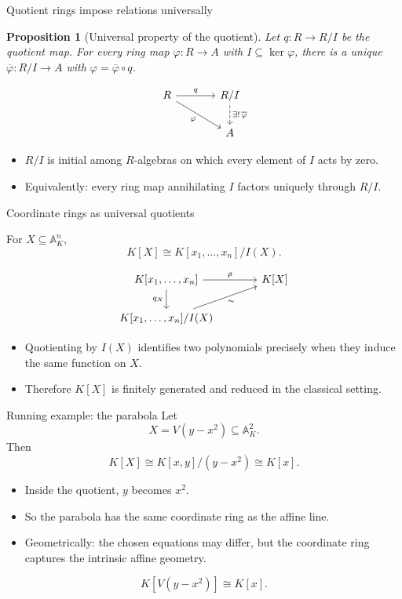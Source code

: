 \documentclass[10pt, aspectratio=169]{beamer}
\newcommand{\A}{\mathbb{A}}
\newtheorem{proposition}[theorem]{Proposition}
\begin{document}
\begin{frame}[fragile]{Quotient rings impose relations universally}
    \begin{proposition}[Universal property of the quotient]
        Let $q : R \to R/I$ be the quotient map. For every ring map
        $\varphi : R \to A$ with $I \subseteq \ker\varphi$, there is a unique
        $\overline{\varphi} : R/I \to A$ with $\varphi = \overline{\varphi} \circ q$.
    \end{proposition}
    \[
    \begin{tikzcd}[column sep=large]
        R \arrow[r, "q"] \arrow[dr, "\varphi"'] & R/I \arrow[d, dashed, "\exists!\,\overline\varphi"] \\
        & A
    \end{tikzcd}
    \]
    \begin{itemize}
        \item $R/I$ is initial among $R$-algebras on which every element of $I$ acts by zero.
        \item Equivalently: every ring map annihilating $I$ factors uniquely through $R/I$.
    \end{itemize}
\end{frame}

\begin{frame}[fragile]{Coordinate rings as universal quotients}
    \begin{corollary}
        For $X \subseteq \A_K^n$,
        \[
        \boxed{K[X] \cong K[x_1,\dots,x_n]/I(X).}
        \]
    \end{corollary}
    \[
    \begin{tikzcd}[column sep=large]
        K[x_1,\dots,x_n] \arrow[r, "\rho"] \arrow[d, "q_X"'] & K[X] \\
        K[x_1,\dots,x_n]/I(X) \arrow[ur, "\sim"'] &
    \end{tikzcd}
    \]
    \begin{itemize}
        \item Quotienting by $I(X)$ identifies two polynomials precisely when they induce the same function on $X$.
        \item Therefore $K[X]$ is finitely generated and reduced in the classical setting.
    \end{itemize}
\end{frame}

\begin{frame}{Running example: the parabola}
    Let
    \[
    X = V(y - x^2) \subseteq \A_K^2.
    \]
    Then
    \[
    K[X] \cong K[x,y]/(y-x^2) \cong K[x].
    \]
    \begin{itemize}
        \item Inside the quotient, $y$ becomes $x^2$.
        \item So the parabola has the same coordinate ring as the affine line.
        \item Geometrically: the chosen equations may differ, but the coordinate ring captures the intrinsic affine geometry.
    \end{itemize}
    \[
    \boxed{K[V(y-x^2)] \cong K[x].}
    \]
\end{frame}
\end{document}
